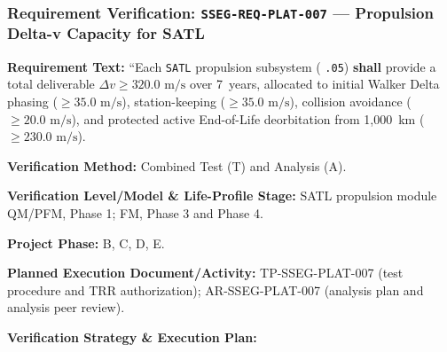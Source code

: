 \subsubsection{Requirement Verification: \texttt{SSEG-REQ-PLAT-007} --- Propulsion Delta-v Capacity for SATL}
\label{ver:SSEG-REQ-PLAT-007}
\textbf{Requirement Text:} ``Each \texttt{SATL} propulsion subsystem ( \texttt{.05}) \textbf{shall} provide a total deliverable $\Delta v \ge 320.0\text{ m/s}$ over 7~years, allocated to initial Walker Delta phasing ($\ge 35.0\text{ m/s}$), station-keeping ($\ge 35.0\text{ m/s}$), collision avoidance ($\ge 20.0\text{ m/s}$), and protected active End-of-Life deorbitation from 1,000~km ($\ge 230.0\text{ m/s}$).
\par\textbf{Verification Method:} Combined Test (T) and Analysis (A).
\par\textbf{Verification Level/Model \& Life-Profile Stage:} SATL propulsion module QM/PFM, Phase 1; FM, Phase 3 and Phase 4.
\par\textbf{Project Phase:} B, C, D, E.
\par\textbf{Planned Execution Document/Activity:} TP-SSEG-PLAT-007 (test procedure and TRR authorization); AR-SSEG-PLAT-007 (analysis plan and analysis peer review).
\par\textbf{Verification Strategy \& Execution Plan:}
